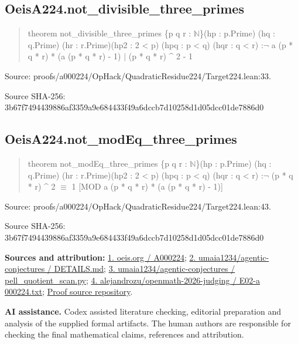 \documentclass[11pt,a4paper]{article}
\begin{document}
\begin{samepage}
\subsection{OeisA224.not\_divisible\_three\_primes}
\begin{quote}\small\ttfamily theorem not\_divisible\_three\_primes \{p q r : \ensuremath{\mathbb{N}}\}\newline     (hp : p.Prime) (hq : q.Prime) (hr : r.Prime)\newline     (hp2 : 2 < p) (hpq : p < q) (hqr : q < r) :\newline     \ensuremath{\neg} a (p * q * r) * (a (p * q * r) - 1) \ensuremath{\mid} (p * q * r) \textasciicircum{} 2 - 1\end{quote}
{\small Source: proofs/a000224/OpHack/QuadraticResidue224/Target224.lean:33.\par}

{\small Source SHA-256: 3b67f7494439886af3359a9e684433f49a6dccb7d10258d1d05dcc01de7886d0\par}

\end{samepage}
\begin{samepage}
\subsection{OeisA224.not\_modEq\_three\_primes}
\begin{quote}\small\ttfamily theorem not\_modEq\_three\_primes \{p q r : \ensuremath{\mathbb{N}}\}\newline     (hp : p.Prime) (hq : q.Prime) (hr : r.Prime)\newline     (hp2 : 2 < p) (hpq : p < q) (hqr : q < r) :\newline     \ensuremath{\neg} (p * q * r) \textasciicircum{} 2 \ensuremath{\equiv} 1 [MOD a (p * q * r) * (a (p * q * r) - 1)]\end{quote}
{\small Source: proofs/a000224/OpHack/QuadraticResidue224/Target224.lean:43.\par}

{\small Source SHA-256: 3b67f7494439886af3359a9e684433f49a6dccb7d10258d1d05dcc01de7886d0\par}

{\small\textbf{Sources and attribution:} \href{https://oeis.org/A000224}{1. oeis.org / A000224}; \href{https://github.com/umaia1234/agentic-conjectures/blob/96ea0039d9dc3a1940b9d5ec1cbe616ed58d1da2/problems/oeis-a000224/DETAILS.md}{2. umaia1234/agentic-conjectures / DETAILS.md}; \href{https://github.com/umaia1234/agentic-conjectures/blob/96ea0039d9dc3a1940b9d5ec1cbe616ed58d1da2/problems/oeis-a000224/pell_quotient_scan.py}{3. umaia1234/agentic-conjectures / pell\_quotient\_scan.py}; \href{https://github.com/alejandrozu/openmath-2026-judging/blob/d0ed487f487fa7ec814ff705ab55249983fe8707/OpenMath-Judging/review/entries/E02-a000224.txt}{4. alejandrozu/openmath-2026-judging / E02-a 000224.txt}; \href{https://github.com/alejandrozu/openmath-2026-judging}{Proof source repository}.\par}

\end{samepage}
{\small \textbf{AI assistance.} Codex assisted literature checking, editorial preparation and analysis of the supplied formal artifacts. The human authors are responsible for checking the final mathematical claims, references and attribution.\par}
\end{document}

